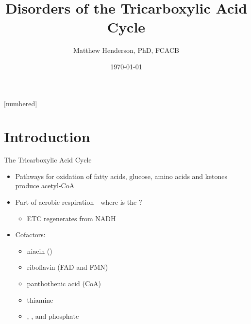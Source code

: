 \documentclass[presentation, smaller]{beamer}
\author{Matthew Henderson, PhD, FCACB}
\date{\today}
\title{Disorders of the Tricarboxylic Acid Cycle}
\institute[NSO]{Newborn Screening Ontario | The University of Ottawa}
\begin{document}
\maketitle


\vspace{220pt}
\beamertemplatenavigationsymbolsempty
{}[numbered]

\section{Introduction}
\label{sec:orga7f5c1e}

\begin{frame}[label={sec:org8eefb5d}]{The Tricarboxylic Acid Cycle}
\begin{itemize}
\item Pathways for oxidation of fatty acids, glucose, amino acids and ketones produce acetyl-CoA
\end{itemize}
\centering
{}
\begin{itemize}
\item Part of aerobic respiration - where is the ?
\begin{itemize}
\item ETC regenerates  from NADH
\end{itemize}
\item Cofactors:
\begin{itemize}
\item niacin ()
\item riboflavin (FAD and FMN)
\item panthothenic acid (CoA)
\item thiamine
\item {}, ,  and phosphate
\end{itemize}
\end{itemize}
\end{frame}
\end{document}
